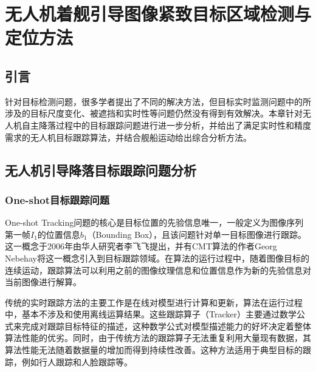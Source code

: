 \chapter{无人机着舰引导图像紧致目标区域检测与定位方法}
\section{引言}
针对目标检测问题，很多学者提出了不同的解决方法，但目标实时监测问题中的所涉及的目标尺度变化、被遮挡和实时性等问题仍然没有得到有效解决。本章针对无人机自主降落过程中的目标跟踪问题进行进一步分析，并给出了满足实时性和精度需求的无人机目标跟踪算法，并结合舰船运动给出综合分析方法。

\section{无人机引导降落目标跟踪问题分析}
\subsection{One-shot目标跟踪问题}
One-shot Tracking问题的核心是目标位置的先验信息唯一，一般定义为图像序列第一帧$I_1$的位置信息$b_1$（Bounding Box），且该问题针对单一目标图像进行跟踪。这一概念于2006年由华人研究者李飞飞提出\cite{fei2006one}，并有CMT算法\cite{Nebehay2016}的作者Georg Nebehay将这一概念引入到目标跟踪领域。在算法的运行过程中，随着图像目标的连续运动，跟踪算法可以利用之前的图像纹理信息和位置信息作为新的先验信息对当前图像进行解算。

传统的实时跟踪方法的主要工作是在线对模型进行计算和更新，算法在运行过程中，基本不涉及和使用离线运算结果。这些跟踪算子（Tracker）主要通过数学公式来完成对跟踪目标特征的描述，这种数学公式对模型描述能力的好坏决定着整体算法性能的优劣。同时，由于传统方法的跟踪算子无法重复利用大量现有数据，其算法性能无法随着数据量的增加而得到持续性改善。这种方法适用于典型目标的跟踪，例如行人跟踪和人脸跟踪等。

